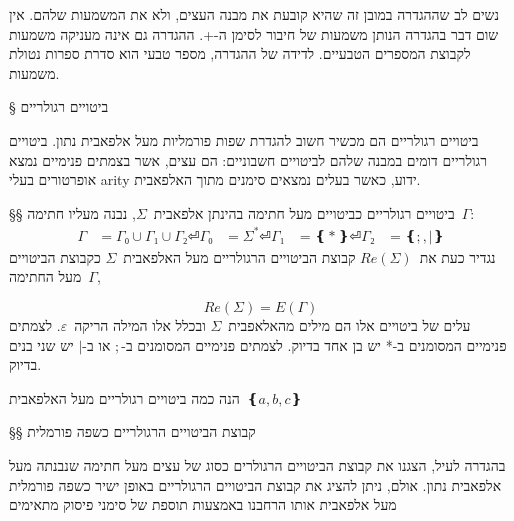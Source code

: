 {נשים לב שההגדרה במובן זה שהיא קובעת את מבנה העצים, ולא את המשמעות שלהם. אין שום
דבר בהגדרה הנותן משמעות של חיבור לסימן ה-+. ההגדרה גם אינה מעניקה משמעות לקבוצת
המספרים הטבעיים. לדידה של ההגדרה, מספר טבעי הוא סדרת ספרות
נטולת משמעות.

§ ביטויים רגולריים

ביטויים רגולריים הם מכשיר חשוב להגדרת שפות פורמליות מעל אלפאבית נתון. ביטויים
רגולריים דומים במבנה שלהם לביטויים חשבוניים: הם עצים, אשר בצמתים פנימיים נמצא
אופרטורים בעלי arity ידוע, כאשר בעלים נמצאים סימנים מתוך האלפאבית.

§§ ביטויים רגולריים כביטויים מעל חתימה
בהינתן אלפאבית~$Σ$, נבנה מעליו חתימה~$Γ$:
\begin{equation}
  \begin{split}
    Γ &=Γ₀∪Γ₁∪Γ₂ ⏎
    Γ₀ &=Σ^* ⏎
    Γ₁ &=❴*❵ ⏎
    Γ₂ &=❴;,|❵
  \end{split}
\end{equation}
נגדיר כעת את~$Re(Σ)$ קבוצת הביטויים הרגולריים מעל האלפאבית~$Σ$ כקבוצת הביטויים מעל
החתימה~$Γ$,

\begin{equation}
  Re(Σ)=E(Γ)
\end{equation}
עלים של ביטויים אלו הם מילים מהאלאפבית~$Σ$ ובכלל אלו המילה הריקה~$ε$. לצמתים פנימיים המסומנים ב-* יש בן אחד בדיוק. לצמתים פנימיים המסומנים ב-$;$ או ב-$|$ יש שני בנים בדיוק.

הנה כמה ביטויים רגולריים מעל האלפאבית~$❴a,b,c❵$
\begin{figure}
  \centering
\end{figure}

§§ קבוצת הביטויים הרגולריים כשפה פורמלית

בהגדרה לעיל, הצגנו את קבוצת הביטויים הרגולרים כסוג של עצים מעל חתימה שנבנתה מעל
אלפאבית נתון. אולם, ניתן להציג את קבוצת הביטויים הרגולריים באופן ישיר כשפה
פורמלית מעל אלפאבית אותו הרחבנו באמצעות תוספת של סימני פיסוק מתאימים

}
